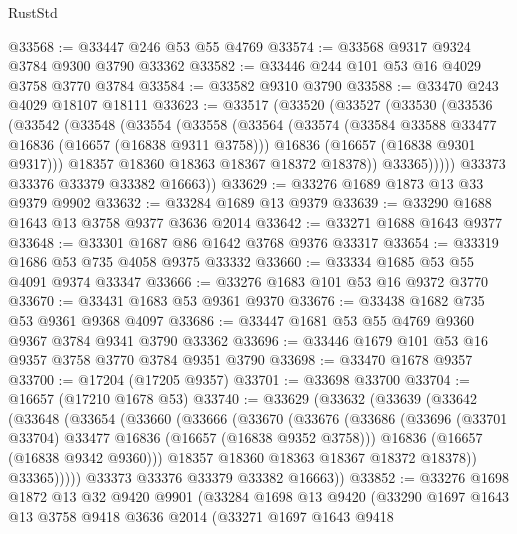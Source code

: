 \begin{lexlean}{RustStd}
\begin{coremodule}
@33568 := @33447 @246 @53 @55 @4769
@33574 := @33568 @9317 @9324 @3784 @9300 @3790 @33362
@33582 := @33446 @244 @101 @53 @16 @4029 @3758 @3770 @3784
@33584 := @33582 @9310 @3790
@33588 := @33470 @243 @4029 @18107 @18111
@33623 := @33517
    (@33520
      (@33527
        (@33530
          (@33536
            (@33542
              (@33548
                (@33554
                  (@33558
                    (@33564
                      (@33574
                        (@33584 @33588 @33477 @16836 (@16657 (@16838 @9311 @3758)))
                        @16836
                        (@16657 (@16838 @9301 @9317)))
                      @18357
                      @18360
                      @18363
                      @18367
                      @18372
                      @18378))
                  @33365)))))
        @33373
        @33376
        @33379
        @33382
        @16663))
@33629 := @33276 @1689 @1873 @13 @33 @9379 @9902
@33632 := @33284 @1689 @13 @9379
@33639 := @33290 @1688 @1643 @13 @3758 @9377 @3636 @2014
@33642 := @33271 @1688 @1643 @9377
@33648 := @33301 @1687 @86 @1642 @3768 @9376 @33317
@33654 := @33319 @1686 @53 @735 @4058 @9375 @33332
@33660 := @33334 @1685 @53 @55 @4091 @9374 @33347
@33666 := @33276 @1683 @101 @53 @16 @9372 @3770
@33670 := @33431 @1683 @53 @9361 @9370
@33676 := @33438 @1682 @735 @53 @9361 @9368 @4097
@33686 := @33447 @1681 @53 @55 @4769 @9360 @9367 @3784 @9341 @3790 @33362
@33696 := @33446 @1679 @101 @53 @16 @9357 @3758 @3770 @3784 @9351 @3790
@33698 := @33470 @1678 @9357
@33700 := @17204 (@17205 @9357)
@33701 := @33698 @33700
@33704 := @16657 (@17210 @1678 @53)
@33740 := @33629
    (@33632
      (@33639
        (@33642
          (@33648
            (@33654
              (@33660
                (@33666
                  (@33670
                    (@33676
                      (@33686
                        (@33696 (@33701 @33704) @33477 @16836 (@16657 (@16838 @9352 @3758)))
                        @16836
                        (@16657 (@16838 @9342 @9360)))
                      @18357
                      @18360
                      @18363
                      @18367
                      @18372
                      @18378))
                  @33365)))))
        @33373
        @33376
        @33379
        @33382
        @16663))
@33852 := @33276
    @1698
    @1872
    @13
    @32
    @9420
    @9901
    (@33284
      @1698
      @13
      @9420
      (@33290
        @1697
        @1643
        @13
        @3758
        @9418
        @3636
        @2014
        (@33271
          @1697
          @1643
          @9418

\end{coremodule}
\end{lexlean}

